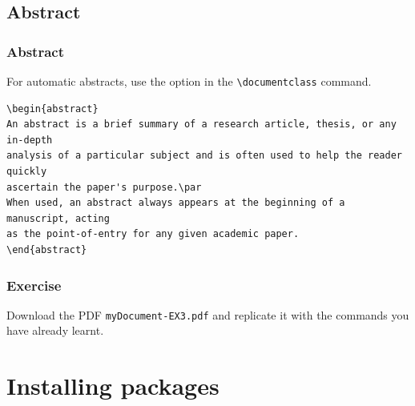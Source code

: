 \subsection{Abstract}

\begin{frame}[fragile]
\frametitle{Abstract}

For automatic abstracts, use the option  in the \lstinline|\documentclass| command.

{\small
\begin{lstlisting}
\begin{abstract}
An abstract is a brief summary of a research article, thesis, or any in-depth 
analysis of a particular subject and is often used to help the reader quickly 
ascertain the paper's purpose.\par 
When used, an abstract always appears at the beginning of a manuscript, acting 
as the point-of-entry for any given academic paper. 
\end{abstract}
\end{lstlisting}
}

\end{frame}


\begin{frame}[fragile]
\frametitle{Exercise}

Download the PDF \alert{\texttt{myDocument-EX3.pdf}} and replicate it with the commands you have already learnt.

\end{frame}


\section{Installing packages}

